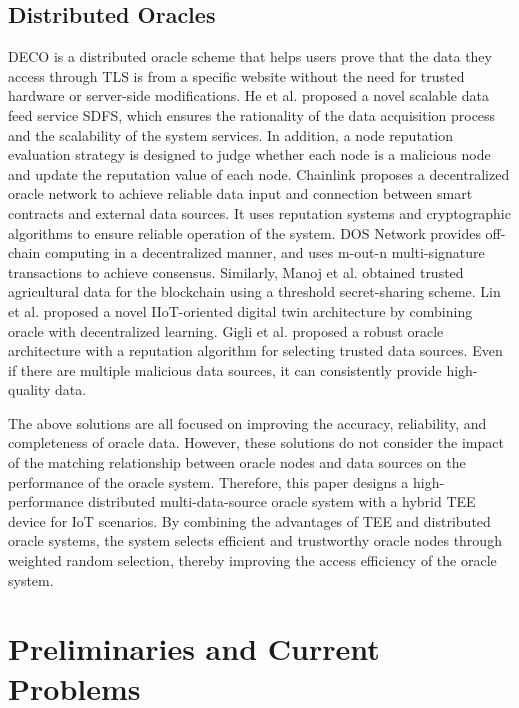 \documentclass[paper]{ieice}
\begin{document}
\subsection{Distributed Oracles}
DECO is a distributed oracle scheme that helps users prove that the data they access through TLS is from a specific website without the need for trusted hardware or server-side modifications\cite{zhang2020deco}. He et al.\cite{he2019sdfs} proposed a novel scalable data feed service SDFS, which ensures the rationality of the data acquisition process and the scalability of the system services. In addition, a node reputation evaluation strategy is designed to judge whether each node is a malicious node and update the reputation value of each node. Chainlink \cite{chainlink} proposes a decentralized oracle network to achieve reliable data input and connection between smart contracts and external data sources. It uses reputation systems and cryptographic algorithms to ensure reliable operation of the system. DOS Network\cite{dos} provides off-chain computing in a decentralized manner, and uses m-out-n multi-signature transactions to achieve consensus. Similarly, Manoj et al.\cite{manoj2023trusted} obtained trusted agricultural data for the blockchain using a threshold secret-sharing scheme. Lin et al.\cite{lin2022novel} proposed a novel IIoT-oriented digital twin architecture by combining oracle with decentralized learning. Gigli et al.\cite{gigli2023decentralized} proposed a robust oracle architecture with a reputation algorithm for selecting trusted data sources. Even if there are multiple malicious data sources, it can consistently provide high-quality data.

The above solutions are all focused on improving the accuracy, reliability, and completeness of oracle data. However, these solutions do not consider the impact of the matching relationship between oracle nodes and data sources on the performance of the oracle system. Therefore, this paper designs a high-performance distributed multi-data-source oracle system with a hybrid TEE device for IoT scenarios. By combining the advantages of TEE and distributed oracle systems, the system selects efficient and trustworthy oracle nodes through weighted random selection, thereby improving the access efficiency of the oracle system.

\section{Preliminaries and Current Problems}
\label{preparation}
\end{document}
